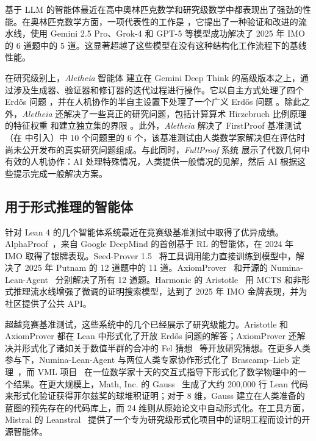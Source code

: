 \documentclass[]{pkuai4m}
\theoremstyle{plain}
\theoremstyle{definition}
\begin{document}
基于 LLM 的智能体最近在高中奥林匹克数学和研究级数学中都表现出了强劲的性能。在奥林匹克数学方面，一项代表性的工作是 \cite{huang2025winning}，它提出了一种验证和改进的流水线，使用 Gemini 2.5 Pro、Grok-4 和 GPT-5 等模型成功解决了 2025 年 IMO 的 6 道题中的 5 道。这显著超越了这些模型在没有这种结构化工作流程下的基线性能。

在研究级别上，\textit{Aletheia} 智能体 \cite{feng2026towards} 建立在 Gemini Deep Think 的高级版本之上，通过涉及生成器、验证器和修订器的迭代过程进行操作。它以自主方式处理了四个 Erdős 问题 \cite{feng2026semi}，并在人机协作的半自主设置下处理了一个广义 Erdős 问题 \cite{barreto2026irrationality}。除此之外，\textit{Aletheia} 还解决了一些真正的研究问题，包括计算算术 Hirzebruch 比例原理的特征权重 \cite{feng2026eigenweights} 和建立独立集的界限 \cite{lee2026lower}。此外，\textit{Aletheia} 解决了 FirstProof 基准测试 \cite{feng2026aletheia}（在 \cite{abouzaid2026first} 中引入）中 10 个问题里的 6 个，该基准测试由人类数学家解决但在评估时尚未公开发布的真实研究问题组成。与此同时，\textit{FullProof} 系统 \cite{bryan2026motivic} 展示了代数几何中有效的人机协作：AI 处理特殊情况，人类提供一般情况的见解，然后 AI 根据这些提示完成一般解决方案。

\subsection{用于形式推理的智能体}

针对 Lean 4 的几个智能体系统最近在竞赛级基准测试中取得了优异成绩。AlphaProof~\cite{hubert2025olympiad}，来自 Google DeepMind 的首创基于 RL 的智能体，在 2024 年 IMO 取得了银牌表现。Seed-Prover 1.5~\cite{chen2025seed} 将工具调用能力直接训练到模型中，解决了 2025 年 Putnam 的 12 道题中的 11 道。AxiomProver~\cite{breen2025ax} 和开源的 Numina-Lean-Agent~\cite{liu2026numina} 分别解决了所有 12 道题。Harmonic 的 Aristotle~\cite{achim2025aristotle} 用 MCTS 和非形式推理流水线增强了微调的证明搜索模型，达到了 2025 年 IMO 金牌表现，并为社区提供了公共 API。

超越竞赛基准测试，这些系统中的几个已经展示了研究级能力。Aristotle 和 AxiomProver 都在 Lean 中形式化了开放 Erd\H{o}s 问题的解答；AxiomProver 还解决并形式化了诸如关于数值半群的合冲的 Fel 猜想~\cite{chen2026fel} 等开放研究猜想。在更多人类参与下，Numina-Lean-Agent 与两位人类专家协作形式化了 Brascamp--Lieb 定理~\cite{liu2026numina}，而 VML 项目~\cite{ilin2026semi} 在一位数学家十天的交互式指导下形式化了数学物理中的一个结果。在更大规模上，Math, Inc. 的 Gauss~\cite{mathinc_spherepacking} 生成了大约 200,000 行 Lean 代码来形式化验证获得菲尔兹奖的球堆积证明；对于 8 维，Gauss 建立在人类准备的蓝图的预先存在的代码库上，而 24 维则从原始论文中自动形式化。在工具方面，Mistral 的 Leanstral~\cite{mistralai2026leanstral} 提供了一个专为研究级形式化项目中的证明工程而设计的开源智能体。
\end{document}

